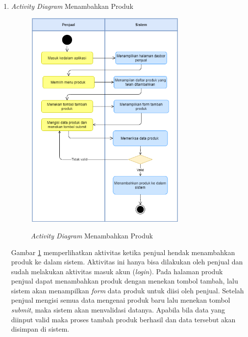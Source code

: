 \begin{enumerate}
	\item \textit{Activity Diagram} Menambahkan Produk
	\begin{figure}[H]
		\centering
		{\includegraphics [width = 8cm, height= 11cm]{gambar/activity diagram/jual produk}}
		\caption{\textit{Activity Diagram} Menambahkan Produk}
		\label{jual produk}
	\end{figure}
	\par Gambar \ref*{jual produk} memperlihatkan aktivitas ketika penjual hendak menambahkan produk ke dalam sistem. Aktivitas ini hanya bisa dilakukan oleh penjual dan sudah melakukan aktivitas masuk akun (\textit{login}). Pada halaman produk penjual dapat menambahkan produk dengan menekan tombol tambah, lalu sistem akan menampilkan \textit{form} data produk untuk diisi oleh penjual. Setelah penjual mengisi semua data mengenai produk baru lalu menekan tombol \textit{submit}, maka sistem akan menvalidasi datanya. Apabila bila data yang diinput valid maka proses tambah produk berhasil dan data tersebut akan disimpan di sistem.


\end{enumerate}
